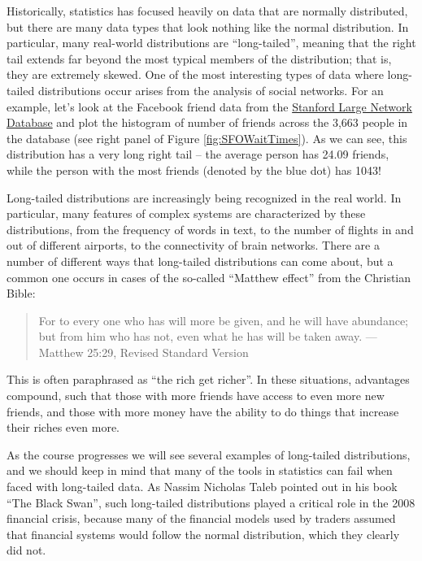 \documentclass[12pt,]{book}
\theoremstyle{definition}
\theoremstyle{definition}
\theoremstyle{definition}
\theoremstyle{remark}
\begin{document}
Historically, statistics has focused heavily on data that are normally distributed, but there are many data types that look nothing like the normal distribution. In particular, many real-world distributions are ``long-tailed'', meaning that the right tail extends far beyond the most typical members of the distribution; that is, they are extremely skewed. One of the most interesting types of data where long-tailed distributions occur arises from the analysis of social networks. For an example, let's look at the Facebook friend data from the \href{https://snap.stanford.edu/data/egonets-Facebook.html}{Stanford Large Network Database} and plot the histogram of number of friends across the 3,663 people in the database (see right panel of Figure \ref{fig:SFOWaitTimes}). As we can see, this distribution has a very long right tail -- the average person has 24.09 friends, while the person with the most friends (denoted by the blue dot) has 1043!

Long-tailed distributions are increasingly being recognized in the real world. In particular, many features of complex systems are characterized by these distributions, from the frequency of words in text, to the number of flights in and out of different airports, to the connectivity of brain networks. There are a number of different ways that long-tailed distributions can come about, but a common one occurs in cases of the so-called ``Matthew effect'' from the Christian Bible:

\begin{quote}
For to every one who has will more be given, and he will have abundance; but from him who has not, even what he has will be taken away. --- Matthew 25:29, Revised Standard Version
\end{quote}

This is often paraphrased as ``the rich get richer''. In these situations, advantages compound, such that those with more friends have access to even more new friends, and those with more money have the ability to do things that increase their riches even more.

As the course progresses we will see several examples of long-tailed distributions, and we should keep in mind that many of the tools in statistics can fail when faced with long-tailed data. As Nassim Nicholas Taleb pointed out in his book ``The Black Swan'', such long-tailed distributions played a critical role in the 2008 financial crisis, because many of the financial models used by traders assumed that financial systems would follow the normal distribution, which they clearly did not.
\end{document}
